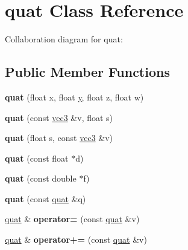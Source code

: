 \hypertarget{classquat}{\section{quat Class Reference}
\label{classquat}
}


Collaboration diagram for quat\+:
\subsection*{Public Member Functions}
\begin{DoxyCompactItemize}
\item 
\hypertarget{classquat_a5284f92399e537ee18cd71980ca1a7c3}{{\bfseries quat} (float x, float \hyperlink{_ice_utils_8h_aa7ffaed69623192258fb8679569ff9ba}{y}, float z, float w)}\label{classquat_a5284f92399e537ee18cd71980ca1a7c3}

\item 
\hypertarget{classquat_ab21fb1fd605aed4867858a197722f9e6}{{\bfseries quat} (const \hyperlink{classvec3}{vec3} \&v, float s)}\label{classquat_ab21fb1fd605aed4867858a197722f9e6}

\item 
\hypertarget{classquat_ad6c0eb5b08a1c62013001088ec2230d5}{{\bfseries quat} (float s, const \hyperlink{classvec3}{vec3} \&v)}\label{classquat_ad6c0eb5b08a1c62013001088ec2230d5}

\item 
\hypertarget{classquat_ab455374c3c347698ede47134b976c2ba}{{\bfseries quat} (const float $\ast$d)}\label{classquat_ab455374c3c347698ede47134b976c2ba}

\item 
\hypertarget{classquat_a3d299e88dc443d98b586a8270087352e}{{\bfseries quat} (const double $\ast$f)}\label{classquat_a3d299e88dc443d98b586a8270087352e}

\item 
\hypertarget{classquat_a1725a31a3c580bc4e9e2b5af02cbfbaf}{{\bfseries quat} (const \hyperlink{classquat}{quat} \&q)}\label{classquat_a1725a31a3c580bc4e9e2b5af02cbfbaf}

\item 
\hypertarget{classquat_a21d40d57d0dd92d71ac7b3fd797dbb71}{\hyperlink{classquat}{quat} \& {\bfseries operator=} (const \hyperlink{classquat}{quat} \&v)}\label{classquat_a21d40d57d0dd92d71ac7b3fd797dbb71}

\item 
\hypertarget{classquat_af0ed15de2212d7dd54f06aa18a012424}{\hyperlink{classquat}{quat} \& {\bfseries operator+=} (const \hyperlink{classquat}{quat} \&v)}\label{classquat_af0ed15de2212d7dd54f06aa18a012424}


\end{DoxyCompactItemize}
